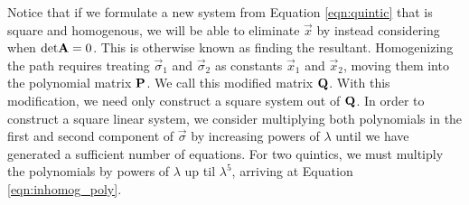 \documentclass[oneside, 11pt]{book}
\begin{document}
Notice that if we formulate a new system from Equation \ref{eqn:quintic} that is square and homogenous, we will be able to eliminate $\vec{x}$ by instead considering when $\text{det}\mathbf{A}=0$. This is otherwise known as finding the resultant\cite{Sederberg84}. Homogenizing the path requires treating $\vec{\sigma}_1$ and $\vec{\sigma}_2$ as constants $\vec{x}_1$ and $\vec{x}_2$, moving them into the polynomial matrix $\mathbf{P}$. We call this modified matrix $\mathbf{Q}$. With this modification, we need only construct a square system out of $\mathbf{Q}$. In order to construct a square linear system, we consider multiplying both polynomials in the first and second component of $\vec{\sigma}$ by increasing powers of $\lambda$ until we have generated a sufficient number of equations. For two quintics, we must multiply the polynomials by powers of $\lambda$ up til $\lambda^5$, arriving at Equation \ref{eqn:inhomog_poly}.
\end{document}

